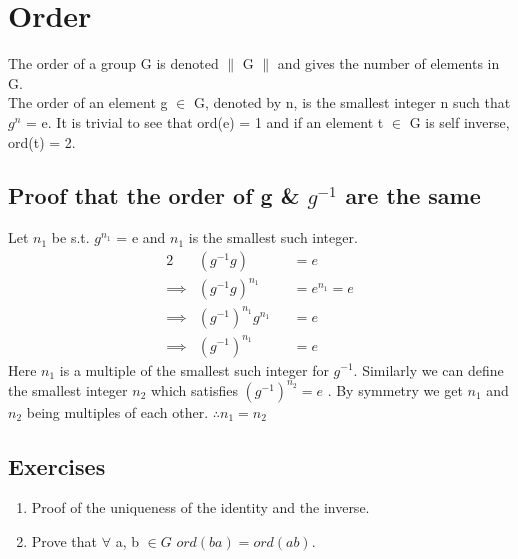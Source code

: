 \documentclass{report}
\begin{document}
\section*{Order}
\large{
	The order of a group G is denoted $\|$ G $\|$ and gives the number of elements in G. 
\\	The order of an element g $\in$ G, denoted by n, is the smallest integer n such that $g^{n}$ = e.
	It is trivial to see that ord(e) = 1 and if an element t $\in$ G is self inverse, ord(t) = 2.

\subsection*{Proof that the order of g \& $g^{-1}$ are the same}
	Let $n_1$ be s.t. $g^{n_1}$ = e and $n_1$ is the smallest such integer.
	\begin{alignat*}{2}
		&(g^{-1}g) &&= e \\
		\implies &(g^{-1}g)^{n_1} &&= e^{n_1} = e\\
		\implies &(g^{-1})^{n_1}g^{n_1} &&= e\\ 
		\implies &(g^{-1})^{n_1} &&= e
	\end{alignat*}
	Here $n_1$ is a multiple of the smallest such integer for $g^{-1}$. Similarly we can define the smallest integer $n_2$ 
	which satisfies $(g^{-1})^{n_2} = e$ . By symmetry we get $n_1$ and $n_2$ being multiples of each other. $\therefore n_1 = n_{2}$
	\newpage

\subsection*{Exercises \\}
	\begin{enumerate}
	\item Proof of the uniqueness of the identity and the inverse.\\
	\item Prove that  $\forall$ a, b $\in G$ $ord(ba) = ord(ab)$.
	\end{enumerate}

}
\end{document}
